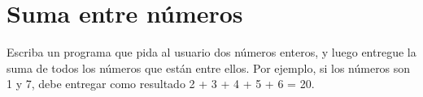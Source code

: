 \section{Suma entre números}

Escriba un programa que pida al usuario dos números enteros, y luego
entregue la suma de todos los números que están entre ellos. Por
ejemplo, si los números son 1 y 7, debe entregar como resultado 2 + 3 +
4 + 5 + 6 = 20.
